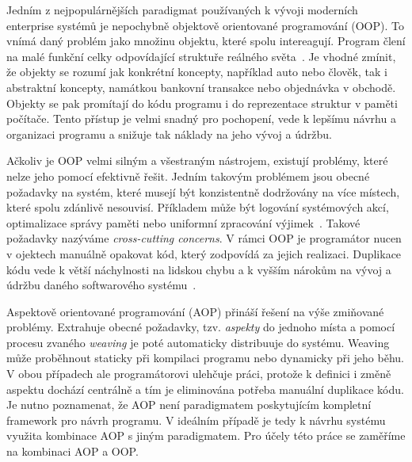 Jedním z nejpopulárnějších paradigmat používaných k
vývoji moderních enterprise systémů je nepochybně
objektově orientované programování (OOP). To vnímá daný problém
jako množinu objektu, které spolu intereagují. Program
člení na malé funkční celky odpovídající struktuře
reálného světa~\cite{rentsch1982object}. Je vhodné zmínit,
že objekty se rozumí jak konkrétní koncepty, například
auto nebo člověk, tak i abstraktní koncepty,
namátkou bankovní transakce nebo objednávka v obchodě.
Objekty se pak promítají do kódu programu i do
reprezentace struktur v paměti počítače.
Tento přístup je velmi snadný pro pochopení,
vede k lepšímu návrhu a organizaci programu a snižuje
tak náklady na jeho vývoj a údržbu.

Ačkoliv je OOP velmi silným a všestraným nástrojem,
existují problémy, které nelze jeho pomocí efektivně řešit.
Jedním takovým problémem jsou obecné požadavky na systém,
které musejí být konzistentně dodržovány na více místech,
které spolu zdánlivě nesouvisí. Příkladem
může být logování systémových akcí, optimalizace správy paměti
nebo uniformní zpracování výjimek~\cite{kiczales1997aspect}.
Takové požadavky nazýváme \textit{cross-cutting concerns}.
V rámci OOP je programátor nucen v ojektech manuálně opakovat
kód, který zodpovídá za jejich realizaci. Duplikace kódu
vede k větší náchylnosti na lidskou chybu a k vyšším nárokům na vývoj
a údržbu daného softwarového systému~\cite{fowler1999refactoring}.

Aspektově orientované programování (AOP) přináší řešení na
výše zmiňované problémy. Extrahuje obecné požadavky,
tzv. \textit{aspekty} do jednoho místa a pomocí procesu zvaného
\textit{weaving} je poté automaticky distribuuje do systému.
Weaving může proběhnout staticky při kompilaci programu nebo dynamicky
při jeho běhu. V obou případech ale programátorovi ulehčuje práci,
protože k definici i změně aspektu dochází centrálně a tím je eliminována
potřeba manuální duplikace kódu. Je nutno poznamenat, že AOP není
paradigmatem poskytujícím kompletní framework pro návrh programu.
V ideálním případě je tedy k návrhu systému využita kombinace
AOP s jiným paradigmatem. Pro účely této práce se zaměříme na
kombinaci AOP a OOP.


